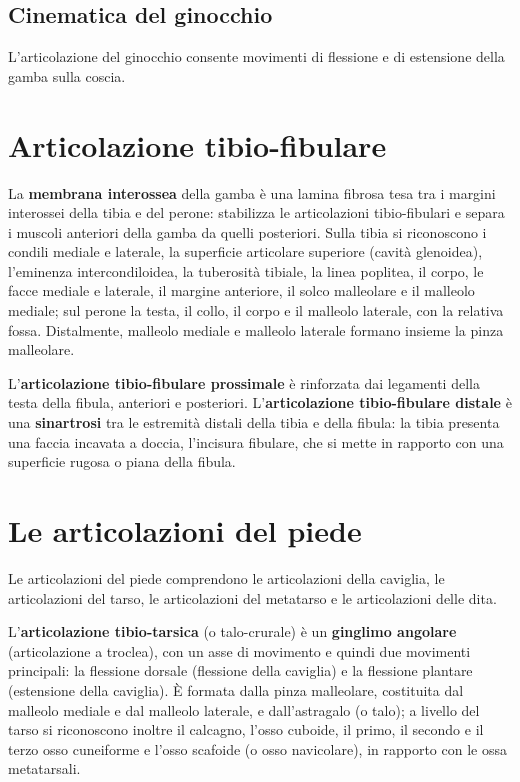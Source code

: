 \subsection{Cinematica del ginocchio}

L'articolazione del ginocchio consente movimenti di flessione e di
estensione della gamba sulla coscia.

\section{Articolazione tibio-fibulare}

La \textbf{membrana interossea} della gamba è una lamina fibrosa tesa tra i
margini interossei della tibia e del perone: stabilizza le articolazioni
tibio-fibulari e separa i muscoli anteriori della gamba da quelli
posteriori. Sulla tibia si riconoscono i condili mediale e laterale, la
superficie articolare superiore (cavità glenoidea), l'eminenza
intercondiloidea, la tuberosità tibiale, la linea poplitea, il corpo, le
facce mediale e laterale, il margine anteriore, il solco malleolare e il
malleolo mediale; sul perone la testa, il collo, il corpo e il malleolo
laterale, con la relativa fossa. Distalmente, malleolo mediale e malleolo
laterale formano insieme la pinza malleolare.

L'\textbf{articolazione tibio-fibulare prossimale} è rinforzata dai
legamenti della testa della fibula, anteriori e posteriori.
L'\textbf{articolazione tibio-fibulare distale} è una \textbf{sinartrosi}
tra le estremità distali della tibia e della fibula: la tibia presenta una
faccia incavata a doccia, l'incisura fibulare, che si mette in rapporto
con una superficie rugosa o piana della fibula.

\section{Le articolazioni del piede}

Le articolazioni del piede comprendono le articolazioni della caviglia, le
articolazioni del tarso, le articolazioni del metatarso e le
articolazioni delle dita.

L'\textbf{articolazione tibio-tarsica} (o talo-crurale) è un
\textbf{ginglimo angolare} (articolazione a troclea), con un asse di
movimento e quindi due movimenti principali: la flessione dorsale
(flessione della caviglia) e la flessione plantare (estensione della
caviglia). È formata dalla pinza malleolare, costituita dal malleolo
mediale e dal malleolo laterale, e dall'astragalo (o talo); a livello del
tarso si riconoscono inoltre il calcagno, l'osso cuboide, il primo, il
secondo e il terzo osso cuneiforme e l'osso scafoide (o osso navicolare),
in rapporto con le ossa metatarsali.

